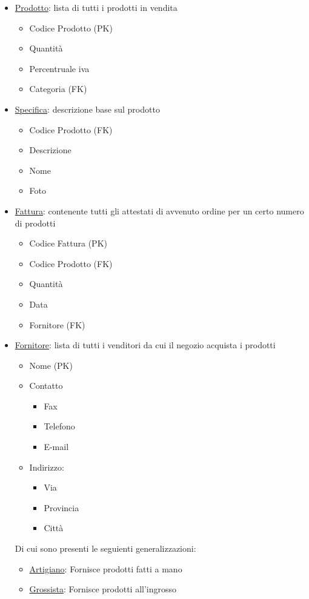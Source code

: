 \begin{itemize}
\item \underline{Prodotto}: lista di tutti i prodotti in vendita
  \begin{itemize}
  \item Codice Prodotto (PK)
  \item Quantit\`a
  \item Percentruale iva
  \item Categoria (FK)
  \end{itemize}

\item \underline{Specifica}: descrizione base sul prodotto
  \begin{itemize}
  \item Codice Prodotto (FK)
  \item Descrizione
  \item Nome
  \item Foto
  \end{itemize}

\item \underline{Fattura}: contenente tutti gli attestati di avvenuto ordine per un certo numero di prodotti
  \begin{itemize}
  \item Codice Fattura (PK)
  \item Codice Prodotto (FK)
  \item Quantit\`a
  \item Data
  \item Fornitore (FK)
  \end{itemize}

\item \underline{Fornitore}: lista di tutti i venditori da cui il negozio acquista i prodotti
  \begin{itemize}
  \item Nome (PK)
  \item Contatto
    \begin{itemize}
    \item Fax
    \item Telefono
    \item E-mail
    \end{itemize}

  \item Indirizzo:
    \begin{itemize}
    \item Via
    \item Provincia
    \item Citt\`a
    \end{itemize}
  \end{itemize}
  Di cui sono presenti le seguienti generalizzazioni:
  \begin{itemize}
  \item \underline{Artigiano}: Fornisce prodotti fatti a mano
  \item \underline{Grossista}: Fornisce prodotti all'ingrosso
  \end{itemize}


\end{itemize}
